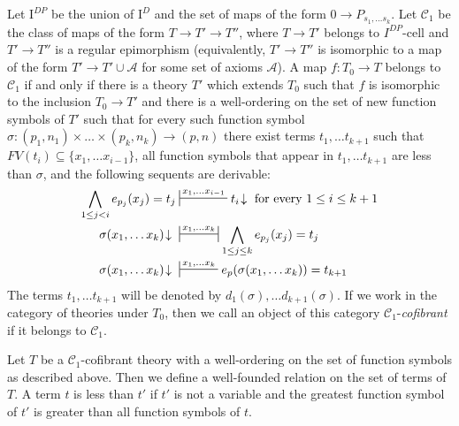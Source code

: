 \documentclass[reqno]{amsart}
\theoremstyle{definition}
\theoremstyle{remark}
\newcommand{\cof}{\mathcal{C}}
\newcommand{\I}{\mathrm{I}}
\newcommand{\class}[2]{#1\text{-}\mathrm{#2}}
\newcommand{\Icell}[1][\I]{\class{#1}{cell}}
\numberwithin{figure}{section}
\begin{document}
Let $\I^{DP}$ be the union of $\I^D$ and the set of maps of the form $0 \to P_{s_1, \ldots s_k}$.
Let $\cof_1$ be the class of maps of the form $T \to T' \to T''$, where $T \to T'$ belongs to $\Icell[I^{DP}]$ and
$T' \to T''$ is a regular epimorphism (equivalently, $T' \to T''$ is isomorphic to a map of the form $T' \to T' \cup \mathcal{A}$ for some set of axioms $\mathcal{A}$).
A map $f : T_0 \to T$ belongs to $\cof_1$ if and only if there is a theory $T'$ which extends $T_0$ such that $f$ is isomorphic to the inclusion $T_0 \to T'$
and there is a well-ordering on the set of new function symbols of $T'$ such that for every such function symbol $\sigma : (p_1,n_1) \times \ldots \times (p_k,n_k) \to (p,n)$
there exist terms $t_1, \ldots t_{k+1}$ such that $FV(t_i) \subseteq \{ x_1, \ldots x_{i-1} \}$, all function symbols that appear in $t_1, \ldots t_{k+1}$ are less than $\sigma$,
and the following sequents are derivable:
\begin{align*}
\bigwedge_{1 \leq j < i} e_{p_j}(x_j) = t_j & \sststile{}{x_1, \ldots x_{i-1}} t_i\!\downarrow \text{ for every } 1 \leq i \leq k+1 \\
\sigma(x_1, \ldots x_k)\!\downarrow\ & \ssststile{}{x_1, \ldots x_k} \bigwedge_{1 \leq j \leq k} e_{p_j}(x_j) = t_j \\
\sigma(x_1, \ldots x_k)\!\downarrow\ & \sststile{}{x_1, \ldots x_k} e_p(\sigma(x_1, \ldots x_k)) = t_{k+1}
\end{align*}
The terms $t_1, \ldots t_{k+1}$ will be denoted by $d_1(\sigma), \ldots d_{k+1}(\sigma)$.
If we work in the category of theories under $T_0$, then we call an object of this category $\cof_1$-\emph{cofibrant} if it belongs to $\cof_1$.

Let $T$ be a $\cof_1$-cofibrant theory with a well-ordering on the set of function symbols as described above.
Then we define a well-founded relation on the set of terms of $T$.
A term $t$ is less than $t'$ if $t'$ is not a variable and the greatest function symbol of $t'$ is greater than all function symbols of $t$.
\end{document}
